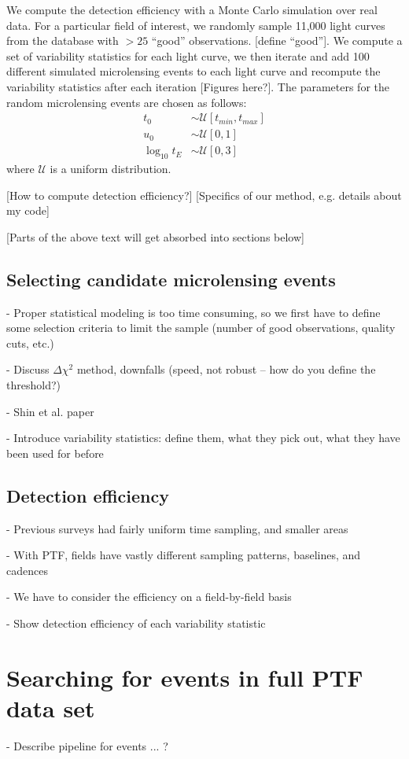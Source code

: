 \documentclass[12pt,preprint]{aastex}
\begin{document}
We compute the detection efficiency with a Monte Carlo simulation over real data. For a particular field of interest, we randomly sample 11,000 light curves from the database with $>25$ ``good'' observations. [define ``good'']. We compute a set of variability statistics for each light curve, we then iterate and add 100 different simulated microlensing events to each light curve and recompute the variability statistics after each iteration [Figures here?]. The parameters for the random microlensing events are chosen as follows: 
\begin{align}
	t_0&\sim\mathcal{U}[t_{min}, t_{max}] \\
	u_0&\sim\mathcal{U}[0, 1] \\
	\log_{10}t_E&\sim\mathcal{U}[0, 3] 
\end{align}
where $\mathcal{U}$ is a uniform distribution.

[How to compute detection efficiency?] [Specifics of our method, e.g. details about my code]

[Parts of the above text will get absorbed into sections below]

\subsection{Selecting candidate microlensing events}
- Proper statistical modeling is too time consuming, so we first have to define some selection criteria to limit the sample (number of good observations, quality cuts, etc.)

- Discuss $\Delta \chi^2$ method, downfalls (speed, not robust -- how do you define the threshold?)

- Shin et al. paper

- Introduce variability statistics: define them, what they pick out, what they have been used for before

\subsection{Detection efficiency}
- Previous surveys had fairly uniform time sampling, and smaller areas

- With PTF, fields have vastly different sampling patterns, baselines, and cadences

- We have to consider the efficiency on a field-by-field basis

- Show detection efficiency of each variability statistic

\section{Searching for events in full PTF data set}
- Describe pipeline for events ... ?
\end{document}
